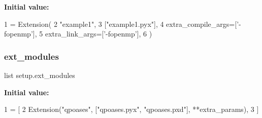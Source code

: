{\bfseries Initial value\+:}
\begin{DoxyCode}
1 =  Extension(
2     \textcolor{stringliteral}{"example1"},
3     [\textcolor{stringliteral}{"example1.pyx"}],
4     extra\_compile\_args=[\textcolor{stringliteral}{'-fopenmp'}],
5     extra\_link\_args=[\textcolor{stringliteral}{'-fopenmp'}],
6 )
\end{DoxyCode}
\mbox{\label{namespacesetup_a75e1b9b094c785fb1fabf9342f43ee73}} 
\subsubsection{\texorpdfstring{ext\+\_\+modules}{ext\_modules}}
{\footnotesize\ttfamily list setup.\+ext\+\_\+modules}

{\bfseries Initial value\+:}
\begin{DoxyCode}
1 =  [
2     Extension(\textcolor{stringliteral}{"qpoases"},  [\textcolor{stringliteral}{"qpoases.pyx"}, \textcolor{stringliteral}{"qpoases.pxd"}],   **extra\_params),
3 ]
\end{DoxyCode}
